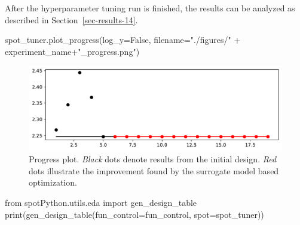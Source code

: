 \documentclass[
  letterpaper,
  DIV=11,
  numbers=noendperiod]{scrreprt}
\newenvironment{Shaded}{\begin{snugshade}}{\end{snugshade}}
\newcommand{\BuiltInTok}[1]{\textcolor[rgb]{0.00,0.23,0.31}{#1}}
\newcommand{\ImportTok}[1]{\textcolor[rgb]{0.00,0.46,0.62}{#1}}
\newcommand{\NormalTok}[1]{\textcolor[rgb]{0.00,0.23,0.31}{#1}}
\newcommand{\OperatorTok}[1]{\textcolor[rgb]{0.37,0.37,0.37}{#1}}
\newcommand{\StringTok}[1]{\textcolor[rgb]{0.13,0.47,0.30}{#1}}
\newcommand{\VariableTok}[1]{\textcolor[rgb]{0.07,0.07,0.07}{#1}}
\begin{document}
After the hyperparameter tuning run is finished, the results can be
analyzed as described in Section~\ref{sec-results-14}.

\begin{Shaded}
\begin{Highlighting}[]
\NormalTok{spot\_tuner.plot\_progress(log\_y}\OperatorTok{=}\VariableTok{False}\NormalTok{,}
\NormalTok{    filename}\OperatorTok{=}\StringTok{"./figures/"} \OperatorTok{+}\NormalTok{ experiment\_name}\OperatorTok{+}\StringTok{"\_progress.png"}\NormalTok{)}
\end{Highlighting}
\end{Shaded}

\begin{figure}[H]

{\centering \includegraphics{31_spot_lightning_csv_files/figure-pdf/cell-13-output-1.pdf}

}

\caption{Progress plot. \emph{Black} dots denote results from the
initial design. \emph{Red} dots illustrate the improvement found by the
surrogate model based optimization.}

\end{figure}

\begin{Shaded}
\begin{Highlighting}[]
\ImportTok{from}\NormalTok{ spotPython.utils.eda }\ImportTok{import}\NormalTok{ gen\_design\_table}
\BuiltInTok{print}\NormalTok{(gen\_design\_table(fun\_control}\OperatorTok{=}\NormalTok{fun\_control, spot}\OperatorTok{=}\NormalTok{spot\_tuner))}
\end{Highlighting}
\end{Shaded}
\end{document}
